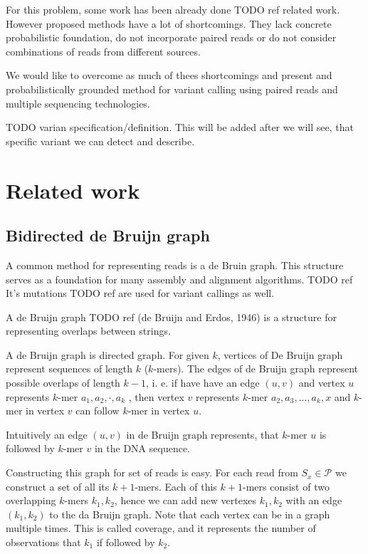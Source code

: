 For this problem, some work has been already done TODO ref related work.
However proposed methods have a lot of shortcomings.
They lack concrete probabilistic foundation, do not incorporate paired reads or do not consider combinations of reads from different sources.

We would like to overcome as much of thees shortcomings and present and probabilistically 
grounded method for variant calling using paired reads and multiple sequencing technologies. 

TODO varian specification/definition. This will be added after we will see, that specific variant we can detect and describe.

\section{Related work}

\subsection{Bidirected de Bruijn graph}
A common method for representing reads is a de Bruin graph. 
This structure serves as a foundation for many assembly and alignment algorithms. TODO ref
It's mutations TODO ref are used for variant callings as well.

A de Bruijn graph TODO ref (de Bruijn and Erdos, 1946) is a structure for representing overlaps
between strings.

\begin{definicia}
A de Bruijn graph is directed graph. 
For given $k$, vertices of De Bruijn graph represent sequences of length $k$ ($k$-mers). 
The edges of de Bruijn graph represent possible overlaps of length $k-1$, i. e. if have have an edge $(u, v)$ and vertex $u$ represents $k$-mer $a_1 , a_2 , \cdot , a_k$ , 
then vertex $v$ represents $k$-mer $a_2 , a_3 , . . . , a_k , x$ and $k$-mer in vertex $v$ can follow $k$-mer in vertex $u$.
\end{definicia}

Intuitively an edge $(u, v)$ in de Bruijn graph represents, that $k$-mer $u$ is followed by $k$-mer $v$ in the DNA sequence.

Constructing this graph for set of reads is easy.
For each read from $ S_x \in \mathcal{P}$ we construct a set of all its $k+1$-mers. 
Each of this $k+1$-mers consist of two overlapping $k$-mers $k_1, k_2$, 
hence we can add new vertexes $k_1, k_2$ with an edge $(k_1, k_2)$ to the da Bruijn graph.
Note that each vertex can be in a graph multiple times. 
This is called coverage, and it represents the number of observations that $k_1$ if followed by $k_2$. 

